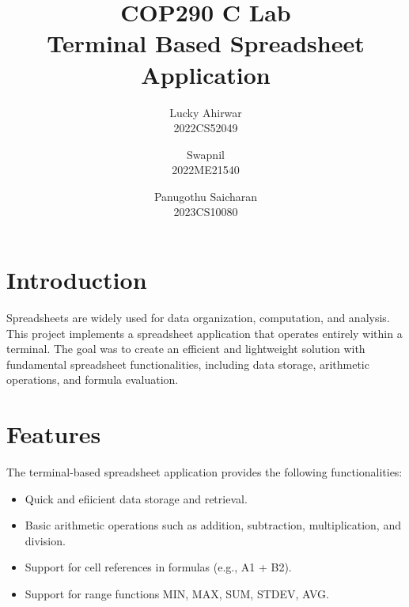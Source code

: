 \documentclass{article}
\title{\textbf{COP290 C Lab} \\ Terminal Based Spreadsheet Application}
\date{\vspace{-5ex}}
\author{Lucky Ahirwar \\
        2022CS52049 \\
        \and Swapnil \\
        2022ME21540 \\
        \and Panugothu Saicharan \\
        2023CS10080 }
\begin{document}
\maketitle

\section{Introduction}
Spreadsheets are widely used for data organization, computation, and analysis. This project implements a spreadsheet application that operates entirely within a terminal. The goal was to create an efficient and lightweight solution with fundamental spreadsheet functionalities, including data storage, arithmetic operations, and formula evaluation.

\section{Features}
The terminal-based spreadsheet application provides the following functionalities:
\begin{itemize}
    \item Quick and efiicient data storage and retrieval.
    \item Basic arithmetic operations such as addition, subtraction, multiplication, and division.
    \item Support for cell references in formulas (e.g., A1 + B2).
    \item Support for range functions MIN, MAX, SUM, STDEV, AVG.
\end{itemize}
\end{document}
